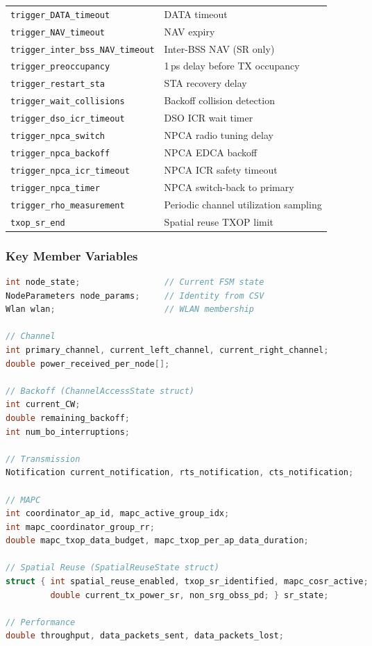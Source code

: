 \documentclass[11pt,a4paper]{article}
\begin{document}
\begin{longtable}{l p{9.5cm}}
\texttt{trigger\_DATA\_timeout}    & DATA timeout \\
\texttt{trigger\_NAV\_timeout}     & NAV expiry \\
\texttt{trigger\_inter\_bss\_NAV\_timeout} & Inter-BSS NAV (SR only) \\
\texttt{trigger\_preoccupancy}     & 1\,ps delay before TX occupancy \\
\texttt{trigger\_restart\_sta}     & STA recovery delay \\
\texttt{trigger\_wait\_collisions} & Backoff collision detection \\
\texttt{trigger\_dso\_icr\_timeout}  & DSO ICR wait timer \\
\texttt{trigger\_npca\_switch}       & NPCA radio tuning delay \\
\texttt{trigger\_npca\_backoff}      & NPCA EDCA backoff \\
\texttt{trigger\_npca\_icr\_timeout} & NPCA ICR safety timeout \\
\texttt{trigger\_npca\_timer}        & NPCA switch-back to primary \\
\texttt{trigger\_rho\_measurement}   & Periodic channel utilization sampling \\
\texttt{txop\_sr\_end}               & Spatial reuse TXOP limit \\
\end{longtable}

\subsubsection{Key Member Variables}

\begin{lstlisting}[language=C++,caption={Selected node member variables (simplified)}]
int node_state;                 // Current FSM state
NodeParameters node_params;     // Identity from CSV
Wlan wlan;                      // WLAN membership

// Channel
int primary_channel, current_left_channel, current_right_channel;
double power_received_per_node[];

// Backoff (ChannelAccessState struct)
int current_CW;
double remaining_backoff;
int num_bo_interruptions;

// Transmission
Notification current_notification, rts_notification, cts_notification;

// MAPC
int coordinator_ap_id, mapc_active_group_idx;
int mapc_coordinator_group_rr;
double mapc_txop_data_budget, mapc_txop_per_ap_data_duration;

// Spatial Reuse (SpatialReuseState struct)
struct { int spatial_reuse_enabled, txop_sr_identified, mapc_cosr_active;
         double current_tx_power_sr, non_srg_obss_pd; } sr_state;

// Performance
double throughput, data_packets_sent, data_packets_lost;
\end{lstlisting}
\end{document}
